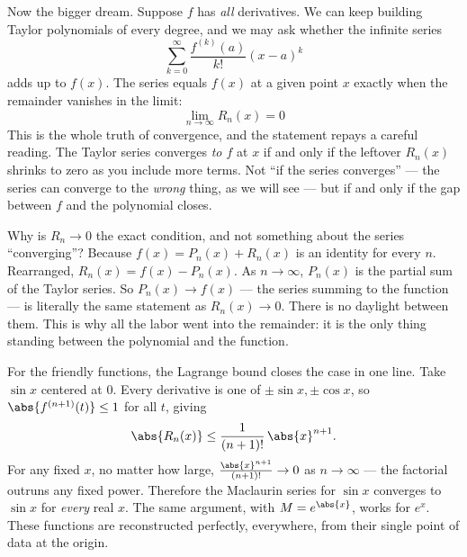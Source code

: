 Now the bigger dream. Suppose $f$ has \emph{all} derivatives. We can keep building
Taylor polynomials of every degree, and we may ask whether the infinite series
\[
  \sum_{k=0}^{\infty} \frac{f^{(k)}(a)}{k!}(x-a)^k
\]
adds up to $f(x)$. The series equals $f(x)$ at a given point $x$ exactly when the
remainder vanishes in the limit:
\[
  \boxed{\;\lim_{n\to\infty} R_n(x) = 0\;}
\]
This is the whole truth of convergence, and the statement repays a careful reading. The Taylor
series converges \emph{to $f$} at $x$ if and only if the leftover $R_n(x)$ shrinks to
zero as you include more terms. Not ``if the series converges'' --- the series can
converge to the \emph{wrong} thing, as we will see --- but if and only if the gap
between $f$ and the polynomial closes.

\begin{whybox}
Why is $R_n \to 0$ the exact condition, and not something about the series
``converging''? Because $f(x) = P_n(x) + R_n(x)$ is an identity for every $n$.
Rearranged, $R_n(x) = f(x) - P_n(x)$. As $n \to \infty$, $P_n(x)$ is the partial sum
of the Taylor series. So $P_n(x) \to f(x)$ --- the series summing to the function ---
is literally the same statement as $R_n(x) \to 0$. There is no daylight between them.
This is why all the labor went into the remainder: it is the only thing standing
between the polynomial and the function.
\end{whybox}

For the friendly functions, the Lagrange bound closes the case in one line. Take
$\sin x$ centered at $0$. Every derivative is one of $\pm\sin x, \pm\cos x$, so
$\abs{f^{(n+1)}(t)} \le 1$ for all $t$, giving
\[
  \abs{R_n(x)} \le \frac{1}{(n+1)!}\,\abs{x}^{n+1}.
\]
For any fixed $x$, no matter how large, $\frac{\abs{x}^{n+1}}{(n+1)!} \to 0$ as
$n\to\infty$ --- the factorial outruns any fixed power. Therefore the Maclaurin
series for $\sin x$ converges to $\sin x$ for \emph{every} real $x$. The same
argument, with $M = e^{\abs{x}}$, works for $e^x$. These functions are reconstructed
perfectly, everywhere, from their single point of data at the origin.

